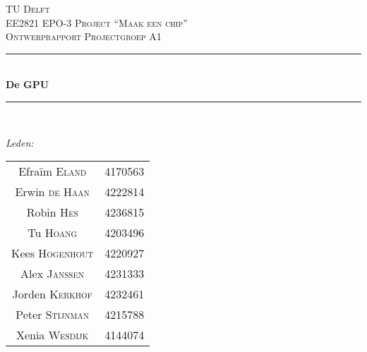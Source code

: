 \documentclass[12pt]{scrreprt}
\begin{document}
\begin{titlepage}

\newcommand{\HRule}{\rule{\linewidth}{0.5mm}} %

\center %
 

\textsc{\LARGE TU Delft}\\[1.5cm] %
\textsc{\Large EE2821 EPO-3 Project ``Maak een chip''}\\[0.5cm] %
\textsc{\large Ontwerprapport Projectgroep A1}\\[0.5cm] %


\HRule \\[0.4cm]
{ \huge \bfseries De GPU}\\[0.2cm] %
\HRule \\[1.5cm]
 

\begin{minipage}{0.4\textwidth}
\begin{flushleft} \large
\emph{Leden:}\\
\begin{tabular}{cc}
Efraïm \textsc{Eland} & 4170563 \\
Erwin \textsc{de Haan} & 4222814\\
Robin \textsc{Hes}& 4236815\\
Tu \textsc{Hoang} &4203496 \\
Kees \textsc{Hogenhout} & 4220927\\
Alex \textsc{Janssen} &	4231333\\
Jorden \textsc{Kerkhof} & 4232461\\
Peter \textsc{Stijnman} & 4215788 \\
Xenia \textsc{Wesdijk} & 4144074\\
\end{tabular}


\end{flushleft}
\end{minipage}
\end{titlepage}
\end{document}
